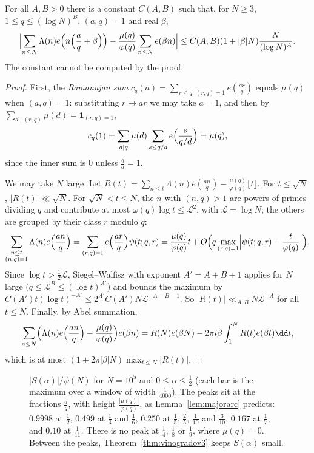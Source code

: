 \begin{lemma}\label{lem:majorarc}
For all $A,B>0$ there is a constant $C(A,B)$ such that, for $N\ge3$, $1\le q\le(\log N)^B$, $(a,q)=1$ and real $\beta$,
\[
\Bigl|\sum_{n\le N}\Lambda(n)e\Bigl(n\Bigl(\frac aq+\beta\Bigr)\Bigr)-\frac{\mu(q)}{\varphi(q)}\sum_{n\le N}e(\beta n)\Bigr|\le C(A,B)(1+|\beta|N)\frac N{(\log N)^A}.
\]
The constant cannot be computed by the proof.
\end{lemma}
\begin{proof}
First, the \emph{Ramanujan sum} $c_q(a)=\sum_{r\le q,\,(r,q)=1}e(\frac{ar}q)$ equals $\mu(q)$ when $(a,q)=1$: substituting $r\mapsto ar$ we may take $a=1$, and then by $\sum_{d\mid(r,q)}\mu(d)=\mathbf 1_{(r,q)=1}$,
\[
c_q(1)=\sum_{d\mid q}\mu(d)\sum_{s\le q/d}e\Bigl(\frac s{q/d}\Bigr)=\mu(q),
\]
since the inner sum is $0$ unless $\frac qd=1$.

We may take $N$ large. Let $R(t)=\sum_{n\le t}\Lambda(n)e(\frac{an}q)-\frac{\mu(q)}{\varphi(q)}\lfloor t\rfloor$. For $t\le\sqrt N$, $|R(t)|\ll\sqrt N$. For $\sqrt N<t\le N$, the $n$ with $(n,q)>1$ are powers of primes dividing $q$ and contribute at most $\omega(q)\log t\le\mathcal L^2$, with $\mathcal L=\log N$; the others are grouped by their class $r$ modulo $q$:
\[
\sum_{\substack{n\le t\\(n,q)=1}}\Lambda(n)e\Bigl(\frac{an}q\Bigr)=\sum_{(r,q)=1}e\Bigl(\frac{ar}q\Bigr)\psi(t;q,r)=\frac{\mu(q)}{\varphi(q)}t+O\Bigl(q\max_{(r,q)=1}\Bigl|\psi(t;q,r)-\frac t{\varphi(q)}\Bigr|\Bigr).
\]
Since $\log t>\frac12\mathcal L$, Siegel--Walfisz with exponent $A'=A+B+1$ applies for $N$ large ($q\le\mathcal L^B\le(\log t)^{A'}$) and bounds the maximum by $C(A')t(\log t)^{-A'}\le2^{A'}C(A')N\mathcal L^{-A-B-1}$. So $|R(t)|\ll_{A,B}N\mathcal L^{-A}$ for all $t\le N$. Finally, by Abel summation,
\[
\sum_{n\le N}\Bigl(\Lambda(n)e\Bigl(\frac{an}q\Bigr)-\frac{\mu(q)}{\varphi(q)}\Bigr)e(\beta n)=R(N)e(\beta N)-2\pi i\beta\int_1^NR(t)e(\beta t)\dd t,
\]
which is at most $(1+2\pi|\beta|N)\max_{t\le N}|R(t)|$.
\end{proof}

\begin{figure}[ht]
\centering
{}
\caption{$|S(\alpha)|/\psi(N)$ for $N=10^5$ and $0\le\alpha\le\frac12$ (each bar is the maximum over a window of width $\frac1{4000}$). The peaks sit at the fractions $\frac aq$, with height $\frac{|\mu(q)|}{\varphi(q)}$, as Lemma~\ref{lem:majorarc} predicts: $0.9998$ at $\frac12$, $0.499$ at $\frac13$ and $\frac16$, $0.250$ at $\frac15$, $\frac25$, $\frac1{10}$ and $\frac3{10}$, $0.167$ at $\frac17$, and $0.10$ at $\frac1{11}$. There is no peak at $\frac14$, $\frac18$ or $\frac19$, where $\mu(q)=0$. Between the peaks, Theorem~\ref{thm:vinogradov3} keeps $S(\alpha)$ small.}
\label{fig:primesum}
\end{figure}

